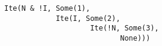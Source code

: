 \begin{lstlisting}[style=scalaioScala]
Ite(N & !I, Some(1),
            Ite(I, Some(2),
                    Ite(!N, Some(3),
                           None)))
\end{lstlisting}
